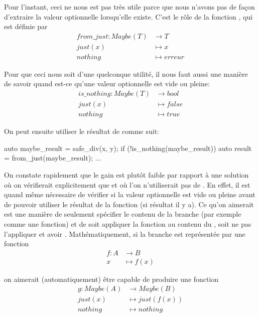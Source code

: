 Pour l'instant, ceci ne nous est pas très utile parce que nous n'avons pas
de façon d'extraire la valeur optionnelle lorsqu'elle existe. C'est le rôle
de la fonction , qui est définie par
\begin{align*}
    from\_just : Maybe(T) &\to T \\
                 just(x) &\mapsto x \\
                 nothing &\mapsto erreur
\end{align*}

Pour que ceci nous soit d'une quelconque utilité, il nous faut aussi une
manière de savoir quand est-ce qu'une valeur optionnelle est vide ou pleine:
\begin{align*}
    is\_nothing : Maybe(T) &\to bool \\
                 just(x) &\mapsto false \\
                 nothing &\mapsto true
\end{align*}

On peut ensuite utiliser le résultat de  comme suit:
\begin{cpp}
    auto maybe_result = safe_div(x, y);
    if (!is_nothing(maybe_result)) {
        auto result = from_just(maybe_result);
        ...
    }
\end{cpp}

On constate rapidement que le gain est plutôt faible par rapport à une
solution où on vérifierait explicitement que  et où l'on
n'utiliserait pas de . En effet, il est quand même nécessaire
de vérifier si la valeur optionnelle est vide ou pleine avant de pouvoir
utiliser le résultat de la fonction (si résultat il y a). Ce qu'on aimerait
est une manière de seulement spécifier le contenu de la branche (par exemple
comme une fonction) et de soit appliquer la fonction au contenu du ,
soit ne pas l'appliquer et avoir . Mathématiquement, si la
branche est représentée par une fonction
\begin{align*}
    f : A &\to B \\
        x &\mapsto f(x)
\end{align*}

on aimerait (automatiquement) être capable de produire une fonction
\begin{align*}
    g : Maybe(A) &\to Maybe(B) \\
        just(x) &\mapsto just(f(x)) \\
        nothing &\mapsto nothing
\end{align*}

